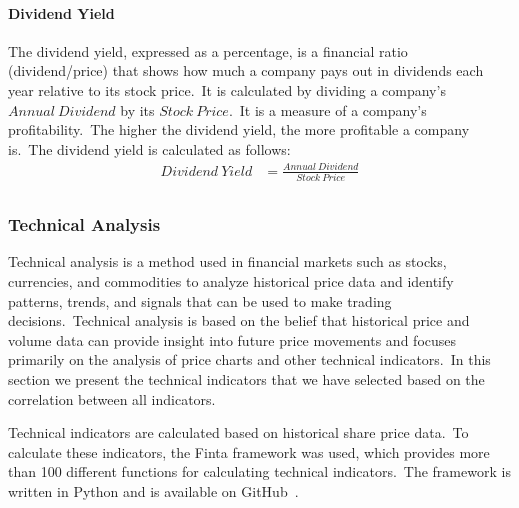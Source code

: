 \documentclass[../xlapes02]{subfiles}
\begin{document}
    \paragraph{Dividend Yield}\label{par:dividend-yield}
    The dividend yield, expressed as a percentage, is a financial ratio (dividend/price) that shows how much a company pays out in dividends each year relative to its stock price.\ It is calculated by dividing a company's $Annual\ Dividend$ by its $Stock\ Price$.\ It is a measure of a company's profitability.\ The higher the dividend yield, the more profitable a company is.\ The dividend yield is calculated as follows:
    \begin{equation}
        \label{eq:dividend-yield}
        \begin{split}
            Dividend\ Yield&=\frac{Annual\ Dividend}{Stock\ Price}\\
        \end{split}
    \end{equation}

    \subsubsection{Technical Analysis}\label{subsubsec:technical-analysis}
    Technical analysis is a method used in financial markets such as stocks, currencies, and commodities to analyze historical price data and identify patterns, trends, and signals that can be used to make trading decisions.\ Technical analysis is based on the belief that historical price and volume data can provide insight into future price movements and focuses primarily on the analysis of price charts and other technical indicators.\ In this section we present the technical indicators that we have selected based on the correlation between all indicators.

    Technical indicators are calculated based on historical share price data.\ To calculate these indicators, the Finta framework was used, which provides more than 100 different functions for calculating technical indicators.\ The framework is written in Python and is available on GitHub~\cite{finta}.
\end{document}
